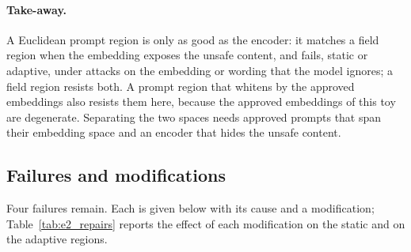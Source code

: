 \documentclass{article}
\theoremstyle{plain}
\theoremstyle{remark}
\begin{document}
\paragraph{Take-away.}
A Euclidean prompt region is only as good as the encoder: it matches a field region when the embedding exposes the unsafe content,
and fails, static or adaptive, under attacks on the embedding or wording that the model ignores; a field region resists both. A
prompt region that whitens by the approved embeddings also resists them here, because the approved embeddings of this toy are
degenerate. Separating the two spaces needs approved prompts that span their embedding space and an encoder that hides the unsafe
content.

\subsection{Failures and modifications}\label{sec:e2_repairs}

Four failures remain. Each is given below with its cause and a modification; Table~\ref{tab:e2_repairs} reports the effect of each
modification on the static and on the adaptive regions.
\end{document}
